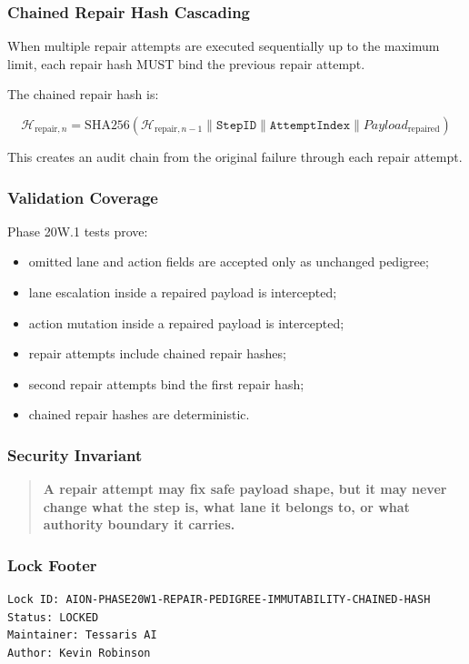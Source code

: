 \subsubsection{Chained Repair Hash Cascading}

When multiple repair attempts are executed sequentially up to the maximum limit, each repair hash MUST bind the previous repair attempt.

The chained repair hash is:

\begin{equation}
\mathcal{H}_{\mathrm{repair},n}
=
\mathrm{SHA256}
(
\mathcal{H}_{\mathrm{repair},n-1}
\parallel
\texttt{StepID}
\parallel
\texttt{AttemptIndex}
\parallel
Payload_{\mathrm{repaired}}
)
\end{equation}

This creates an audit chain from the original failure through each repair attempt.

\subsubsection{Validation Coverage}

Phase 20W.1 tests prove:

\begin{itemize}
  \item omitted lane and action fields are accepted only as unchanged pedigree;
  \item lane escalation inside a repaired payload is intercepted;
  \item action mutation inside a repaired payload is intercepted;
  \item repair attempts include chained repair hashes;
  \item second repair attempts bind the first repair hash;
  \item chained repair hashes are deterministic.
\end{itemize}

\subsubsection{Security Invariant}

\begin{quote}
\textbf{A repair attempt may fix safe payload shape, but it may never change what the step is, what lane it belongs to, or what authority boundary it carries.}
\end{quote}

\subsubsection{Lock Footer}

\begin{verbatim}
Lock ID: AION-PHASE20W1-REPAIR-PEDIGREE-IMMUTABILITY-CHAINED-HASH
Status: LOCKED
Maintainer: Tessaris AI
Author: Kevin Robinson
\end{verbatim}
